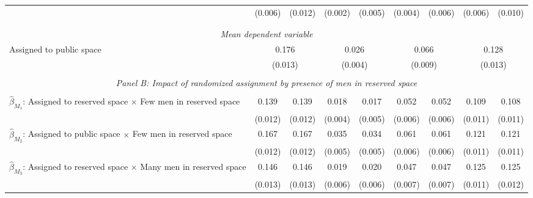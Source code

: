 \begin{tabular}{l*{8}{c}}
                    &     (0.006)         &     (0.012)         &     (0.002)         &     (0.005)         &     (0.004)         &     (0.006)         &     (0.006)         &     (0.010)         \\
\\[-1.8ex] \hline \\[-1.8ex] \multicolumn{9}{c}{\textit{Mean dependent variable}} \\ Assigned to public space & \multicolumn{2}{c}{0.176} & \multicolumn{2}{c}{0.026} & \multicolumn{2}{c}{0.066} & \multicolumn{2}{c}{0.128} \\ \, & \multicolumn{2}{c}{(0.013)} & \multicolumn{2}{c}{(0.004)} & \multicolumn{2}{c}{(0.009)} & \multicolumn{2}{c}{(0.013)} \\ 

\hline \\[-1ex] \multicolumn{9}{c}{\textit{Panel B: Impact of randomized assignment by presence of men in reserved space}} \\\\[-1ex]
$\hat\beta_{M_1}$: Assigned to reserved space $\times$ Few men in reserved space&       0.139\sym{***}&       0.139\sym{***}&       0.018\sym{***}&       0.017\sym{***}&       0.052\sym{***}&       0.052\sym{***}&       0.109\sym{***}&       0.108\sym{***}\\
                    &     (0.012)         &     (0.012)         &     (0.004)         &     (0.005)         &     (0.006)         &     (0.006)         &     (0.011)         &     (0.011)         \\
[1em]
$\hat\beta_{M_2}$: Assigned to public space $\times$ Few men in reserved space&       0.167\sym{***}&       0.167\sym{***}&       0.035\sym{***}&       0.034\sym{***}&       0.061\sym{***}&       0.061\sym{***}&       0.121\sym{***}&       0.121\sym{***}\\
                    &     (0.012)         &     (0.012)         &     (0.005)         &     (0.005)         &     (0.006)         &     (0.006)         &     (0.011)         &     (0.011)         \\
[1em]
$\hat\beta_{M_3}$: Assigned to reserved space $\times$ Many men in reserved space&       0.146\sym{***}&       0.146\sym{***}&       0.019\sym{***}&       0.020\sym{***}&       0.047\sym{***}&       0.047\sym{***}&       0.125\sym{***}&       0.125\sym{***}\\
                    &     (0.013)         &     (0.013)         &     (0.006)         &     (0.006)         &     (0.007)         &     (0.007)         &     (0.011)         &     (0.012)         \\

\end{tabular}
